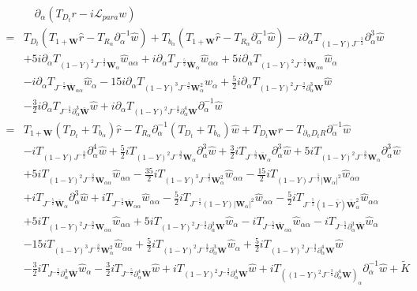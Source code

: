 \documentclass[10pt]{amsart}
\theoremstyle{remark}
\theoremstyle{definition}
\numberwithin{equation}{section}
\newcommand{\p}{\partial}
\newcommand{\al}{\alpha}
\newcommand{\f}{\frac}
\newcommand{\bw}{\mathbf{W}}
\begin{document}
\begin{align*}
&\quad\p_\al(T_{D_t}r-i\mathcal{L}_{para}w) \\
=&  T_{D_t}(T_{1+\bw}\hat{r} - T_{R_\alpha}\partial_\alpha^{-1}\hat{w}) + T_{b_\alpha}(T_{1+\bw}\hat{r} - T_{R_\alpha}\partial_\alpha^{-1}\hat{w}) -i\p_\al T_{(1-Y)J^{-\f32}}\p_{\al}^3 \hat{w}\\
&+5i\p_\al T_{(1-Y)^2J^{-\f32}\mathbf{W}_{\al}} \hat{w}_{\al \al}+i\p_\al T_{J^{-\f52}\bar{\bw}_{\al}} \hat{w}_{\al \al}+5i \p_\al T_{(1-Y)^2J^{-\f32}\mathbf{W}_{\al\al}}\hat{w}_{\al}\\
&-i\p_\al T_{J^{-\f52}\bar{\mathbf{W}}_{\al\al}}\hat{w}_{\al}-15i\p_\al T_{(1-Y)^3J^{-\f32}\mathbf{W}^2_{\al}}\hat{w}_{\al} +\f52 i\p_\al T_{(1-Y)^2J^{-\f32}\p^3_{\al}\mathbf{W}}\hat{w}\\
&-\f32 i\p_\al T_{J^{-\f52}\p^3_{\al}\bar{\mathbf{W}}}\hat{w}+ i\p_\al T_{(1-Y)^2J^{-\f32}\p^4_{\al}\mathbf{W}}\p_\al^{-1} \hat{w} \\
=& T_{1+\bw}(T_{D_t}+T_{b_\alpha})\hat{r} - T_{R_\alpha}\partial_\alpha^{-1}(T_{D_t} + T_{b_\alpha})\hat{w} + T_{D_t \bw}\hat{r} - T_{\partial_\alpha D_t R}\partial_\alpha^{-1} \hat{w} \\
&-i T_{(1-Y)J^{-\f32}}\p_{\al}^4 \hat{w} + \f52  i T_{(1-Y)^2J^{-\f32}\bw_\al}\p_{\al}^3 \hat{w}  + \f32  i T_{J^{-\f52}\bar{\bw}_\al}\p_{\al}^3 \hat{w} +5i T_{(1-Y)^2J^{-\f32}\mathbf{W}_{\al}} \p_\al^3\hat{w} \\
&+5i T_{(1-Y)^2J^{-\f32}\mathbf{W}_{\al\al}} \hat{w}_{\al \al} -\f{35}{2}iT_{(1-Y)^3J^{-\f32}\bw_\al^2} \hat{w}_{\al \al} - \f{15}{2}iT_{(1-Y)J^{-\f52}|\bw_\al|^2}\hat{w}_{\al \al} \\
&+i T_{J^{-\f52}\bar{\bw}_{\al}} \p_\al^3\hat{w} +i T_{J^{-\f52}\bar{\bw}_{\al \al}} \hat{w}_{\al \al} - \f52i T_{J^{-\f52}(1-Y) |\bw_{\al}|^2} \hat{w}_{\al \al} - \f52i T_{J^{-\f52}(1-\bar{Y}) \bar{\bw}_{\al}^2} \hat{w}_{\al \al} \\
&+5i  T_{(1-Y)^2J^{-\f32}\mathbf{W}_{\al\al}}\hat{w}_{\al \al} +5i  T_{(1-Y)^2J^{-\f32}\p_\al^3\mathbf{W}}\hat{w}_{\al} -i T_{J^{-\f52}\bar{\mathbf{W}}_{\al\al}}\hat{w}_{\al\al} -i T_{J^{-\f52}\p_\al^3\bar{\mathbf{W}}}\hat{w}_{\al} \\
& -15i T_{(1-Y)^3J^{-\f32}\mathbf{W}^2_{\al}}\hat{w}_{\al \al} +\f52 i T_{(1-Y)^2J^{-\f32}\p^3_{\al}\mathbf{W}}\hat{w}_\al +\f52 i T_{(1-Y)^2J^{-\f32}\p^4_{\al}\mathbf{W}}\hat{w} \\
& -\f32 i  T_{J^{-\f52}\p^3_{\al}\bar{\mathbf{W}}}\hat{w}_\al -\f32 i T_{J^{-\f52}\p^4_{\al}\bar{\mathbf{W}}}\hat{w} + i T_{(1-Y)^2J^{-\f32}\p^4_{\al}\mathbf{W}} \hat{w} + i T_{((1-Y)^2J^{-\f32}\p^4_{\al}\mathbf{W})_\al}\p_\al^{-1} \hat{w} + \tilde{K} \\

\end{align*}
\end{document}
